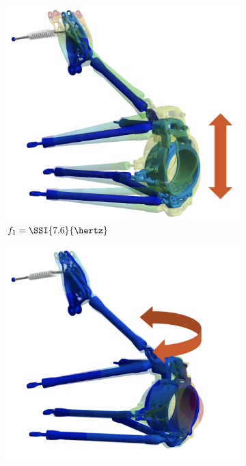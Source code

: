 \begin{figure}[htb]
  \centering
  \begin{subfigure}[c]{0.225\textwidth}
    \centering
    \includegraphics[width=1.0\linewidth]{figures/chapter_5/suspension_mode_1}
    \caption{$f_1 = \SSI{7.6}{\hertz}$}
  \end{subfigure}
  \begin{subfigure}[c]{0.225\textwidth}
    \centering
    \includegraphics[width=1.0\linewidth]{figures/chapter_5/suspension_mode_2}

\end{subfigure}
\end{figure}

